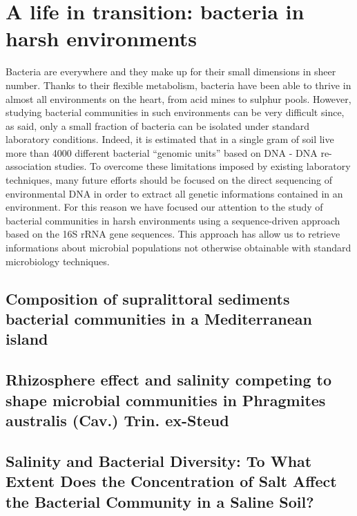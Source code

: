 \logvartrue
\chapter{A life in transition: bacteria in harsh environments}
Bacteria are everywhere and they make up for their small dimensions in sheer number. Thanks to their flexible metabolism, bacteria have been able to thrive in almost all environments on the heart, from acid mines to sulphur pools. However, studying bacterial communities in such environments can be very difficult since, as said, only a small fraction of bacteria can be isolated under standard laboratory conditions. Indeed, it is estimated that in a single gram of soil live more than 4000 different bacterial ``genomic units'' based on DNA - DNA re-association studies. To overcome these limitations imposed by existing laboratory techniques, many future efforts should be focused on the direct sequencing of environmental DNA in order to extract all genetic informations contained in an environment. For this reason we have focused our attention to the study of bacterial communities in harsh environments using a sequence-driven approach based on the 16S rRNA gene sequences. This approach has allow us to retrieve informations about microbial populations not otherwise obtainable with standard microbiology techniques.\\

\section{Composition of supralittoral sediments bacterial communities in a Mediterranean island}
\newpage

\newpage

\section{Rhizosphere effect and salinity competing to shape microbial communities in Phragmites australis (Cav.) Trin. ex-Steud}
\newpage

\newpage

\section{Salinity and Bacterial Diversity: To What Extent Does the Concentration of Salt Affect the Bacterial Community in a Saline Soil?}
\newpage

\newpage


\backmatter
{}
\renewcommand{\sectionmark}[1]{\markright{#1}}
\sectionmark{Bibliography}

